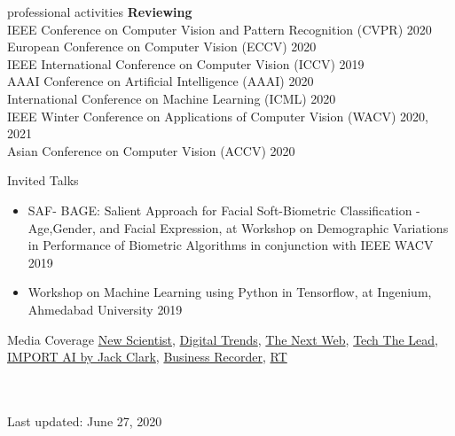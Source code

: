 \documentclass{resume}
\begin{document}
\begin{rSection}{professional activities}
{\bf Reviewing} \\
IEEE Conference on Computer Vision and Pattern Recognition (CVPR) \hfill{2020} \\
European Conference on Computer Vision (ECCV) \hfill{2020} \\
IEEE International Conference on Computer Vision (ICCV) \hfill {2019} \\
AAAI Conference on Artificial Intelligence (AAAI) \hfill {2020} \\
International Conference on Machine Learning (ICML) \hfill {2020} \\ 
IEEE Winter Conference on Applications of Computer Vision (WACV) \hfill {2020, 2021} \\
Asian Conference on Computer Vision (ACCV) \hfill {2020} 
\end{rSection}
\begin{rSection}{Invited Talks}
\begin{itemize}
    \item SAF- BAGE: Salient Approach for Facial Soft-Biometric Classification - Age,Gender, and Facial Expression, at Workshop on Demographic Variations in Performance of Biometric Algorithms in conjunction with IEEE WACV \hfill{2019} 

    \item Workshop on Machine Learning using Python in Tensorflow, at Ingenium, Ahmedabad University \hfill{2019}
\end{itemize}

\end{rSection}
\begin{rSection} {Media Coverage}
\href{https://www.newscientist.com/article/2183766-search-engine-for-cctv-lets-you-find-people-from-their-description/}{New Scientist}, \href{https://www.digitaltrends.com/cool-tech/surveillance-footage-written-description/}{Digital Trends}, \href{https://tnw.to/I1gTz}{The Next Web}, \href{https://techthelead.com/ai-can-identify-people-in-surveillance-footage-by-height-clothing-color-and-gender/}{Tech The Lead}, \href{https://jack-clark.net/2018/10/22/import-ai-117-surveillance-search-engines-harvesting-real-world-road-data-with-hovering-drones-and-improving-language-with-unsupervised-pre-training/}{IMPORT AI by Jack Clark}, \href{https://www.brecorder.com/2018/10/24/448920/new-ai-can-search-people-based-on-height-gender-clothing-in-surveillance-videos/}{Business Recorder}, \href{https://www.rt.com/news/442123-ai-cctv-search-engine/?utm_campaign=fullarticle&utm_medium=referral&utm_source=inshorts}{RT}
\\
\\
\\
\end{rSection}
\begin{center}

Last updated: June 27, 2020

\end{center}
\end{document}
